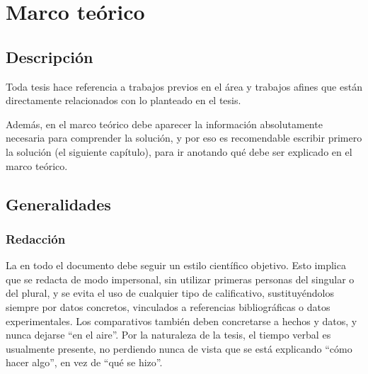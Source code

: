 \chapter{Marco teórico}
\label{ch:marco}

\section{Descripción}

Toda tesis hace referencia a trabajos previos en el área y trabajos afines que
están directamente relacionados con lo planteado en el tesis.

Además, en el marco teórico debe aparecer la información absolutamente
necesaria para comprender la solución, y por eso es recomendable escribir
primero la solución (el siguiente capítulo), para ir anotando qué debe ser
explicado en el marco teórico.

\section{Generalidades}

\begin{comment}
Se recomienda revisar las guías de publicación de la \nt{IEEE} en
\url{http://www.ieee.org/publications_standards/publications/authors/authors_journals.html},
donde puede encontrar cómo hacer referencias bibliográficas
correctamente, cómo citar ecuaciones, cuadros y figuras, etc.  Además,
puede buscar en Google por la última versión del ``Biblatex Cheat
Sheet'' para el resumen de cómo construir correctamente cada
referencia.

\end{comment}

\subsection{Redacción}

La  en todo el documento debe seguir un estilo científico
objetivo. Esto implica que se redacta de modo impersonal, sin utilizar primeras
personas del singular o del plural, y se evita el uso de cualquier tipo de
calificativo, sustituyéndolos siempre por datos concretos, vinculados a
referencias bibliográficas o datos experimentales. Los comparativos también
deben concretarse a hechos y datos, y nunca dejarse ``en el aire''. Por la
naturaleza de la tesis, el tiempo verbal es usualmente presente, no perdiendo
nunca de vista que se está explicando ``cómo hacer algo'', en vez de ``qué se
hizo''.

